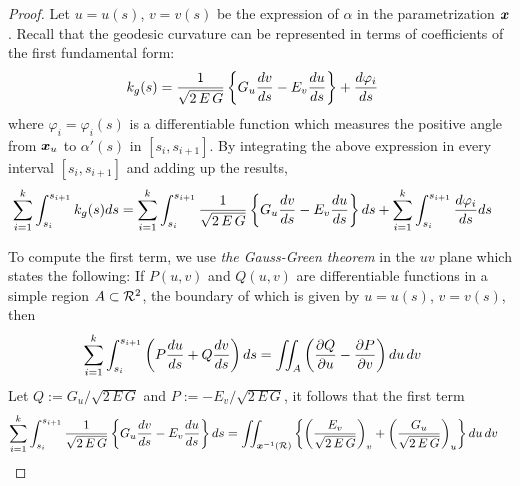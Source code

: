 \documentclass[11pt]{article}
\begin{document}
\begin{itemize}
\begin{proof}
Let $u = u(s)$, $v = v(s)$ be the expression of $\alpha$ in the parametrization $\boldsymbol{x}$. Recall that the geodesic curvature can be represented in terms of coefficients of the first fundamental form:
\begin{align*}
k_{g}(s) &= \frac{1}{\sqrt{2\,E\,G}}\left\{G_{u}\frac{dv}{ds} - E_{v}\frac{du}{ds} \right\} + \frac{d\varphi_{i}}{ds}
\end{align*} where $\varphi_i = \varphi_i(s)$ is a differentiable function which measures the positive angle from $\boldsymbol{x}_u$ to $\alpha'(s)$ in $[s_i,s_{i+1}]$. By integrating the above expression in every interval $[s_i,s_{i+1}]$ and adding up the results,
\begin{align*}
\sum_{i=1}^{k}\int_{s_{i}}^{s_{i+1}}k_{g}(s)ds &= \sum_{i=1}^{k}\int_{s_{i}}^{s_{i+1}}\frac{1}{\sqrt{2\,E\,G}}\left\{G_{u}\frac{dv}{ds} - E_{v}\frac{du}{ds} \right\}ds + \sum_{i=1}^{k}\int_{s_{i}}^{s_{i+1}}\frac{d\varphi_{i}}{ds}ds
\end{align*}

To compute the first term, we use \emph{the Gauss-Green theorem} in the $uv$ plane which states the following: 
If $P(u,v)$ and $Q(u,v)$ are differentiable functions in a simple region $A \subset {\mathcal R}^2$, the boundary of which is given by $u = u(s)$, $v = v(s)$, then
\begin{align*}
\sum_{i=1}^{k}\int_{s_{i}}^{s_{i+1}}\left(P\frac{du}{ds} + Q\frac{dv}{ds}\right)ds &= \iint_{A} \left(\frac{\partial Q}{ \partial u} - \frac{\partial P}{ \partial v}\right)du\,dv
\end{align*}
Let $Q:= G_{u}/\sqrt{2\,E\,G}$ and $P:= -E_{v}/\sqrt{2\,E\,G}$, it follows that the first term 
\begin{align*}
\sum_{i=1}^{k}\int_{s_{i}}^{s_{i+1}}\frac{1}{\sqrt{2\,E\,G}}\left\{G_{u}\frac{dv}{ds} - E_{v}\frac{du}{ds} \right\}ds
&= \iint_{\boldsymbol{x}^{-1}({\mathcal R})}\left\{\left(\frac{E_{v}}{\sqrt{2\,E\,G}}\right)_{v} + \left(\frac{G_{u}}{\sqrt{2\,E\,G}}\right)_{u} \right\} du\,dv
\end{align*}


\end{proof}
\end{itemize}
\end{document}
